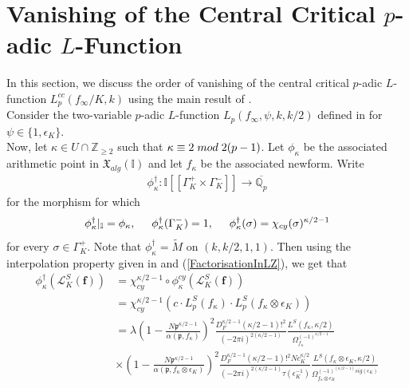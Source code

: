 \documentclass[reqno,10pt]{amsart}
\newcommand{\qp}{\mathbb{Q}_{p}}
\newcommand{\z}{\mathbb{Z}}
\newcommand{\I}{\mathbb{I}}
\newcommand{\f}{\mathbf{f}}
\newcommand{\p}{\mathfrak{p}}
\theoremstyle{plain}
\theoremstyle{definition}
\begin{document}
\section{Vanishing of the Central Critical $p$-adic $L$-Function}
In this section, we discuss the order of vanishing of the central critical $p$-adic $L$-function $L_p^{cc}(f_\infty/K,k)$ using the main result of \cite{MokHeegnerPoints}. \\
Consider the two-variable $p$-adic $L$-function $L_p(f_\infty,\psi,k,k/2)$ defined in \cite[Section 8]{MokExceptionalZero} for $\psi \in \{1,\epsilon_K\}$.
\\
Now, let $\kappa \in U \cap \z_{\geq 2}$ such that $\kappa \equiv 2 \hspace{1mm} mod \hspace{1mm} 2(p-1)$. Let $\phi_\kappa$ be the associated arithmetic point in $\mathfrak{X}_{alg}(\I)$ and let $f_\kappa$ be the associated newform. Write
\begin{align*}
    \phi_\kappa^\dagger : \I[[\Gamma_K^+ \times \Gamma_K^-]] \rightarrow \overline{\qp}
\end{align*}
for the morphism for which
\begin{align*}
    \phi_\kappa^\dagger|_\I = \phi_\kappa, \hspace{5mm} \phi_\kappa^\dagger(\Gamma_K^-) = 1, \hspace{5mm} \phi_\kappa^\dagger(\sigma) = \chi_{cy}(\sigma)^{\kappa/2 - 1}
\end{align*}
for every $\sigma \in \Gamma_K^+$. Note that $\phi_\kappa^\dagger = \widetilde{M}$ on $(k,k/2,1,1)$. Then using the interpolation property given in \cite[Theorem 1.1.2]{BergdallHansen} and (\ref{FactorisationInLZ}), we get that
\begin{align*}
    \phi_\kappa^\dagger(\mathcal{L}^S_K(\f)) & = \chi_{cy}^{\kappa/2 - 1} \circ \phi_\kappa^{cy}(\mathcal{L}^S_K(\f)) \\
    & = \chi_{cy}^{\kappa/2 - 1}(c \cdot L_p^S(f_\kappa) \cdot L_p^S(f_\kappa \otimes \epsilon_K)) \\
    & = \lambda \left(1 - \frac{N\p^{\kappa/2 - 1}}{\alpha(\p,f_\kappa)} \right)^2 \frac{D_F^{\kappa/2 - 1}(\kappa/2 - 1)!^2}{(-2\pi i)^{2(\kappa/2-1)}} \frac{L^S(f_\kappa,\kappa/2)}{\Omega_{f_{\kappa}}^{(-1)^{\kappa/2-1}}} \\
    & \times \left(1 - \frac{N\p^{\kappa/2 - 1}}{\alpha(\p,f_\kappa \otimes \epsilon_K)} \right)^2 \frac{D_F^{\kappa/2 - 1}(\kappa/2 - 1)!^2 Nc_K^{\kappa/2}}{(-2\pi i)^{2(\kappa/2-1)} \tau(\epsilon_K^{-1})} \frac{L^S(f_\kappa \otimes \epsilon_K,\kappa/2)}{\Omega_{f_{\kappa} \otimes \epsilon_K}^{(-1)^{(\kappa/2-1)}sig(\epsilon_K)}}
\end{align*}
\end{document}
